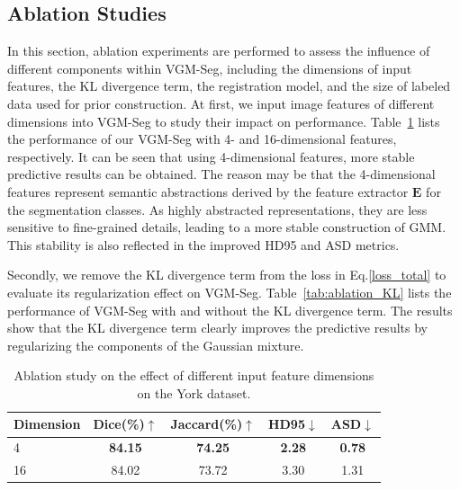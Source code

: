 \documentclass[preprint,12pt]{elsarticle}
\begin{document}


\subsection{Ablation Studies}
In this section, ablation experiments are performed to assess the influence of different components within VGM-Seg, including the dimensions of input features, the KL divergence term, the registration model, and the size of labeled data used for prior construction.
%
At first, we input image features of different dimensions into VGM-Seg to study their impact on performance.
Table~\ref{tab:ablation_dimension} lists the performance of our VGM-Seg with 4- and 16-dimensional features, respectively. It can be seen that using 4-dimensional features, more stable predictive results can be obtained. 
The reason may be that the 4-dimensional features represent semantic abstractions derived by the feature extractor $\mathbf{E}$ for the segmentation classes. As highly abstracted representations, they are less sensitive to fine-grained details, leading to a more stable construction of GMM. This stability is also reflected in the improved HD95 and ASD metrics.

Secondly, we remove the KL divergence term from the loss in Eq.\eqref{loss_total} to evaluate its regularization effect on VGM-Seg. 
Table~\ref{tab:ablation_KL} lists the performance of VGM-Seg with and without the KL divergence term. The results show that the KL divergence term clearly improves the predictive results by regularizing the components of the Gaussian mixture.

\begin{table}[htbp]
  \centering
  \caption{Ablation study on the effect of different input feature dimensions on the York dataset.}
  \begin{tabular}{l c c c c}
    \toprule
    	Dimension & Dice(\%)$\uparrow$ & Jaccard(\%)$\uparrow$ & HD95$\downarrow$ & ASD$\downarrow$ \\
    \midrule
    4 & \textbf{84.15} & \textbf{74.25} & \textbf{2.28 } & \textbf{0.78} \\
    16  & 84.02 & 73.72 & 3.30 & 1.31 \\
    \bottomrule
  \end{tabular}
  \label{tab:ablation_dimension}
\end{table}
\end{document}
